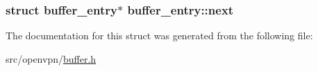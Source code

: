 \subsubsection[{next}]{\setlength{\rightskip}{0pt plus 5cm}struct {\bf buffer\+\_\+entry}$\ast$ buffer\+\_\+entry\+::next}\label{structbuffer__entry_a26b1c9d47a4329655cccf3916631b247}


The documentation for this struct was generated from the following file\+:\begin{DoxyCompactItemize}
\item 
src/openvpn/\hyperlink{buffer_8h}{buffer.\+h}\end{DoxyCompactItemize}
